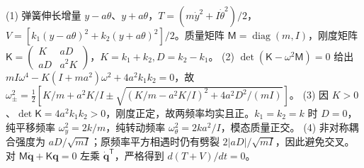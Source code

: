 (1) 弹簧伸长增量 \(y-a\theta\)、\(y+a\theta\)，\(T=(m\dot y^2+I\dot\theta^2)/2\)，\(V=[k_1(y-a\theta)^2+k_2(y+a\theta)^2]/2\)。质量矩阵 \(\mathsf M=\operatorname{diag}(m,I)\)，刚度矩阵 \(\mathsf K=\begin{pmatrix}K&aD\\aD&a^2K\end{pmatrix}\)，\(K=k_1+k_2,D=k_2-k_1\)。
(2) \(\det(\mathsf K-\omega^2\mathsf M)=0\) 给出 \(mI\omega^4-K(I+ma^2)\omega^2+4a^2k_1k_2=0\)，故 \(\omega_\pm^2=\frac12[K/m+a^2K/I\pm\sqrt{(K/m-a^2K/I)^2+4a^2D^2/(mI)}]\)。
(3) 因 \(K>0\)、\(\det\mathsf K=4a^2k_1k_2>0\)，刚度正定，故两频率均实且正。\(k_1=k_2=k\) 时 \(D=0\)，纯平移频率 \(\omega_y^2=2k/m\)，纯转动频率 \(\omega_\theta^2=2ka^2/I\)，模态质量正交。
(4) 非对称耦合强度为 \(aD/\sqrt{mI}\)；原频率平方相遇时仍有劈裂 \(2|aD|/\sqrt{mI}\)，因此避免交叉。对 \(\mathsf M\ddot{\mathbf q}+\mathsf K\mathbf q=0\) 左乘 \(\dot{\mathbf q}^{\mathsf T}\)，严格得到 \(d(T+V)/dt=0\)。
